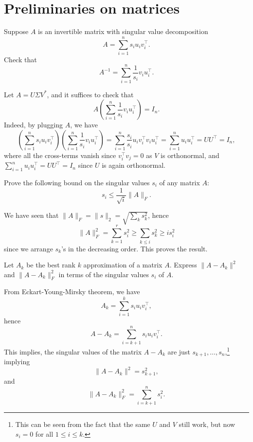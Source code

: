 \section{Preliminaries on matrices}
\begin{problem*}[Exercise 4.1.1]\label{ex4.1.1}
	Suppose \(A\) is an invertible matrix with singular value decomposition
	\[
		A
		= \sum_{i=1}^{n} s_i u_i v_i ^{\top} .
	\]
	Check that
	\[
		A^{-1}
		= \sum_{i=1}^{n} \frac{1}{s_i} v_i u_i ^{\top} .
	\]
\end{problem*}
\begin{answer}
	Let \(A = U \Sigma V^{\ast} \), and it suffices to check that
	\[
		A \left( \sum_{i=1}^{n} \frac{1}{s_i} v_i u_i ^{\top}  \right) = I_n.
	\]
	Indeed, by plugging \(A\), we have
	\[
		\left( \sum_{i=1}^{n} s_i u_i v_i ^{\top} \right) \left( \sum_{i=1}^{n} \frac{1}{s_i} v_i u_i ^{\top} \right)
		= \sum_{i=1}^{n} \frac{s_i}{s_i} u_i v_i ^{\top} v_i u_i ^{\top}
		= \sum_{i=1}^{n} u_i u_i ^{\top}
		= U U^{\top}
		= I_n,
	\]
	where all the cross-terms vanish since \(v_i ^{\top} v_j = 0\) as \(V\) is orthonormal, and \(\sum_{i=1}^{n} u_i u_i ^{\top} = U U^{\top} = I_n\) since \(U\) is again orthonormal.
\end{answer}

\begin{problem*}[Exercise 4.1.2]\label{ex4.1.2}
	Prove the following bound on the singular values \(s_i\) of any matrix \(A\):
	\[
		s_i
		\leq \frac{1}{\sqrt{i} } \lVert A \rVert _F.
	\]
\end{problem*}
\begin{answer}
	We have seen that \(\lVert A \rVert _F = \lVert s \rVert _2 = \sqrt{\sum_{k} s_k^2} \), hence
	\[
		\lVert A \rVert _F^2 = \sum_{k=1}^{r} s_i^2 \geq \sum_{k \leq i} s_k^2 \geq i s_i^2
	\]
	since we arrange \(s_k\)'s in the decreasing order. This proves the result.
\end{answer}

\begin{problem*}[Exercise 4.1.3]\label{ex4.1.3}
	Let \(A_k\) be the best rank \(k\) approximation of a matrix \(A\). Express \(\lVert A - A_k \rVert ^2\) and \(\lVert A - A_k \rVert _F^2\) in terms of the singular values \(s_i\) of \(A\).
\end{problem*}
\begin{answer}
	From Eckart-Young-Mirsky theorem, we have
	\[
		A_k = \sum_{i=1}^{k} s_i u_i v_i ^{\top} ,
	\]
	hence
	\[
		A - A_k
		= \sum_{i=k+1}^{n} s_i u_i v_i ^{\top} .
	\]
	This implies, the singular values of the matrix \(A - A_k\) are just \(s_{k+1}, \dots , s_n\),\footnote{This can be seen from the fact that the same \(U\) and \(V\) still work, but now \(s_i = 0\) for all \(1 \leq i \leq k\).} implying
	\[
		\lVert A - A_k \rVert ^2
		= s_{k+1}^2,
	\]
	and
	\[
		\lVert A - A_k \rVert _F^2
		= \sum_{i=k+1}^{n} s_i^2.
	\]
\end{answer}

